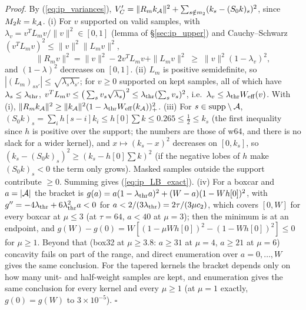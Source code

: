 \documentclass{article}
\numberwithin{equation}{section}   %
\begin{document}
{\em Proof.}  By (\ref{eq:ip_variances}), $V'_C = \|R_m k_{\cal A}\|^2 + \sum_{s \notin m_2}(k_s - (S_0k)_s)^2$,
since $M_2 k = k_{\cal A}$.
(i) For $v$ supported on valid samples, with $\lambda_v = v^TL_mv/\|v\|^2 \in [0,1]$ (lemma of
\S\ref{sec:ip_upper}) and Cauchy--Schwarz $(v^TL_mv)^2 \le \|v\|^2\|L_mv\|^2$,
\begin{equation}
\|R_mv\|^2 = \|v\|^2 - 2v^TL_mv + \|L_mv\|^2 \;\ge\; \|v\|^2(1 - \lambda_v)^2 ,
\end{equation}
and $(1 - \lambda)^2$ decreases on $[0,1]$.
(ii) $L_m$ is positive semidefinite, so $|(L_m)_{ss'}| \le \sqrt{\lambda_s\lambda_{s'}}$; for $v \ge 0$
supported on kept samples, all of which have $\lambda_s \le \lambda_{\rm thr}$,
$v^TL_mv \le \big(\sum_s v_s\sqrt{\lambda_s}\big)^2 \le \lambda_{\rm thr}(\sum_s v_s)^2$, i.e.\
$\lambda_v \le \lambda_{\rm thr}W_{\rm eff}(v)$.  With (i), $\|R_mk_{\cal A}\|^2 \ge \|k_{\cal A}\|^2(1 - \lambda_{\rm thr}W_{\rm eff}(k_{\cal A}))_+^2$.
(iii) For $s \in {\rm supp}\setminus{\cal A}$, $(S_0k)_s = \sum_i h[s-i]k_i \le h[0]\sum k \le 0.265 \le \tfrac12 \le k_s$
(the first inequality since $h$ is positive over the support; the numbers are those of w64, and there
is no slack for a wider kernel), and
$x \mapsto (k_s - x)^2$ decreases on $[0, k_s]$, so $(k_s - (S_0k)_s)^2 \ge (k_s - h[0]\sum k)^2$ (if the
negative lobes of $h$ make $(S_0k)_s < 0$ the term only grows).  Masked samples outside the support
contribute $\ge 0$.  Summing gives (\ref{eq:ip_LB_exact}).
(iv) For a boxcar and $a = |{\cal A}|$ the bracket is $g(a) = a(1 - \lambda_{\rm thr}a)^2 + (W - a)(1 - Wh[0])^2$,
with $g'' = -4\lambda_{\rm thr} + 6\lambda_{\rm thr}^2 a < 0$ for $a < 2/(3\lambda_{\rm thr}) = 2\tau/(3\mu c_2)$,
which covers $[0, W]$ for every boxcar at $\mu \le 3$ (at $\tau = 64$, $a < 40$ at $\mu = 3$); then the
minimum is at an endpoint, and $g(W) - g(0) = W[(1 - \mu Wh[0])^2 - (1 - Wh[0])^2] \le 0$ for $\mu \ge 1$.
Beyond that (box32 at $\mu \ge 3.8$: $a \ge 31$ at $\mu = 4$, $a \ge 21$ at $\mu = 6$) concavity fails on
part of the range, and direct enumeration over $a = 0, \ldots, W$ gives the same conclusion.  For the tapered kernels the
bracket depends only on how many unit- and half-weight samples are kept, and enumeration gives the same
conclusion for every kernel and every $\mu \ge 1$ (at $\mu = 1$ exactly, $g(0) = g(W)$ to
$3 \times 10^{-5}$).  $\square$
\end{document}
